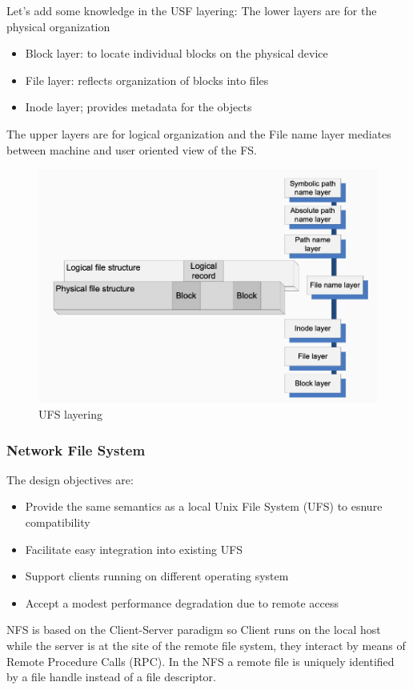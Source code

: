 Let's add some knowledge in the USF layering:
The lower layers are for the physical organization
\begin{itemize}
    \item Block layer: to locate individual blocks on the physical device
    \item File layer: reflects organization of blocks into files
    \item Inode layer; provides metadata for the objects
\end{itemize}
The upper layers are for logical organization and the File name layer mediates between machine and user oriented view of the FS.
\begin{figure}[h!]
    \centering
    \includegraphics[scale=0.35]{images/UFSlayering.png}
    \caption{UFS layering}
    \label{fig:usfl}
\end{figure}

\subsubsection{Network File System}
The design objectives are:
\begin{itemize}
    \item Provide the same semantics as a local Unix File System (UFS) to esnure compatibility
    \item Facilitate easy integration into existing UFS
    \item Support clients running on different operating system 
    \item Accept a modest performance degradation due to remote access
\end{itemize}
NFS is based on the Client-Server paradigm so Client runs on the local host while the server is at the site of the remote file system, they interact by means of Remote Procedure Calls (RPC). In the NFS a remote file is uniquely identified by a file handle instead of a file descriptor.


